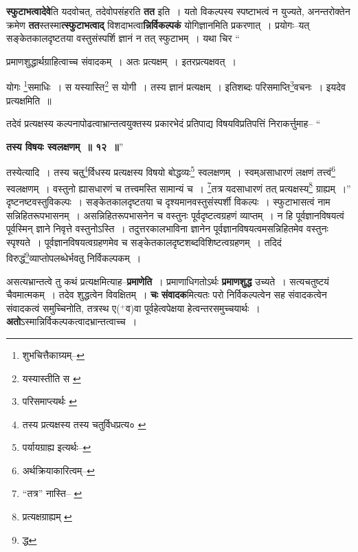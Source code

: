 \documentclass[article,12pt,a4paper]{memoir}
\newcommand{\add}[1]{($^{+}$#1)}
\begin{document}
	  \pstart \textbf{स्फुटाभत्वादेवे}ति यदवोचत्, तदेवोपसंहरति \textbf{तत} इति । यतो विकल्पस्य स्पष्टाभत्वं न युज्यते, अनन्तरोक्तेन क्रमेण \textbf{तत}स्तस्मा\textbf{त्स्फुटाभत्वाद्} विशदाभत्वा\textbf{न्निर्विकल्पकं} योगिज्ञानमिति प्रकरणात् । प्रयोगः--यत् सङ्केतकालदृष्टतया वस्तुसंस्पर्शि ज्ञानं न तत् स्फुटाभम् । यथा चिर \leavevmode{} “
	  
	प्रमाणशुद्धार्थग्राहित्वाच्च संवादकम् । अतः प्रत्यक्षम् । इतरप्रत्यक्षवत् । 
	  
	योगः \footnote{शुभचित्तैकाग्र्यम्--\cite{dp-msD-n}}\-समाधिः । स यस्यास्ति\footnote{यस्यास्तीति स \cite{dp-msC}} स योगी । तस्य ज्ञानं प्रत्यक्षम् । इतिशब्दः परिसमाप्ति\footnote{परिसमाप्त्यर्थः \cite{dp-msA} \cite{dp-edP} \cite{dp-edH} \cite{dp-edE} \cite{dp-edN}}\-वचनः । इयदेव प्रत्यक्षमिति ॥ 
	  
	तदेवं प्रत्यक्षस्य कल्पनापोढत्वाभ्रान्तत्वयुक्तस्य प्रकारभेदं प्रतिपाद्य विषयविप्रतिपत्तिं निराकर्त्तुमाह-- “
	  
	\textbf{तस्य विषयः स्वलक्षणम् ॥ १२ ॥}” 
	  
	तस्येत्यादि । तस्य चतु\footnote{तस्य प्रत्यक्षस्य \cite{dp-msC} तस्य चतुर्विधप्रत्य० \cite{dp-msA} \cite{dp-edP} \cite{dp-edH} \cite{dp-edE} \cite{dp-edN}}\-र्विधस्य प्रत्यक्षस्य विषयो बोद्धव्यः\footnote{पर्यायग्राह्य इत्यर्थः--\cite{dp-msD-n}} स्वलक्षणम् । स्वम्असाधारणं लक्षणं तत्त्वं\footnote{अर्थक्रियाकारित्वम्--\cite{dp-msD-n}} स्वलक्षणम् । वस्तुनो ह्यासधारणं च तत्त्वमस्ति सामान्यं च । \footnote{“तत्र” नास्ति--\cite{dp-msA} \cite{dp-msB} \cite{dp-msD} \cite{dp-edP} \cite{dp-edH} \cite{dp-edE}}\-तत्र यदसाधारणं तत् प्रत्यक्षस्य\footnote{प्रत्यक्षग्राह्यम् \cite{dp-msA} \cite{dp-msB} \cite{dp-edP} \cite{dp-edH} \cite{dp-edE}} ग्राह्यम् ।” दृष्टनष्टवस्तुविकल्पः । सङ्केतकालदृष्टतया च दृश्यमानवस्तुसंस्पर्शी विकल्पः । स्फुटाभासत्वं नाम सन्निहितरूपभासनम् । असन्निहितरूपभासनेन च वस्तुनः पूर्वदृष्टत्वग्रहणं व्याप्तम् । न हि पूर्वज्ञानविषयत्वं पूर्वस्मिन् ज्ञाने निवृत्ते वस्तुनोऽस्ति । तदुत्तरकालभाविना ज्ञानेन पूर्वज्ञानविषयत्वमसन्निहितमेव वस्तुनः स्पृश्यते । पूर्वज्ञानविषयत्वग्रहणमेव च सङ्केतकालदृष्टशब्दविशिष्टत्वग्रहणम् । तदिदं विरुद्धं\footnote{द्ध}\-व्याप्तोपलब्धेर्भवतु निर्विकल्पकम् ।
	\pend
      

	  \pstart असत्यभ्रान्तत्वे तु कथं प्रत्यक्षमित्याह--\textbf{प्रमाणेति} । प्रमाणाधिगतोऽर्थः \textbf{प्रमाणशुद्ध} उच्यते । सत्यचतुष्टयं चैवमात्मकम् । तदेव शुद्धत्वेन विवक्षितम् । \textbf{चः} \leavevmode{} \textbf{संवादक}मित्यतः परो निर्विकल्पत्वेन सह संवादकत्वेन संवादकत्वं समुच्चिनोति, तत्रस्थ ए\add{व}वा पूर्वहेत्वपेक्षया हेत्वन्तरसमुच्चयार्थः । \textbf{अतो}ऽस्मान्निर्विकल्पकत्वादभ्रान्तत्वाच्च ।
	\pend
      
\end{document}
